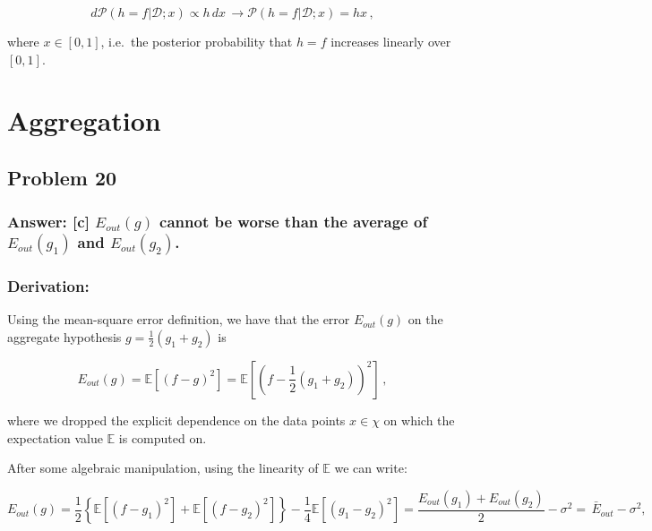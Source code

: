 \documentclass[11pt]{article}
\begin{document}
\begin{equation}
d\mathcal{P}(h=f|\mathcal{D};x)\propto h \,dx \,\rightarrow \mathcal{P}(h=f|\mathcal{D};x)=hx \,,
\end{equation}

where \(x\in[0,1]\), i.e.~the posterior probability that \(h=f\)
increases linearly over \([0,1]\).

    \hypertarget{aggregation}{%
\section{Aggregation}\label{aggregation}}

\hypertarget{problem-20}{%
\subsection{Problem 20}\label{problem-20}}

\hypertarget{answer-c-e_outg-cannot-be-worse-than-the-average-of-e_outg_1-and-e_outg_2.}{%
\subsubsection{\texorpdfstring{Answer: {[}c{]} \(E_{out}(g)\) cannot be
worse than the average of \(E_{out}(g_1)\) and
\(E_{out}(g_2)\).}{Answer: {[}c{]} E\_\{out\}(g) cannot be worse than the average of E\_\{out\}(g\_1) and E\_\{out\}(g\_2).}}\label{answer-c-e_outg-cannot-be-worse-than-the-average-of-e_outg_1-and-e_outg_2.}}

\hypertarget{derivation}{%
\subsubsection{Derivation:}\label{derivation}}

Using the mean-square error definition, we have that the error
\(E_{out}(g)\) on the aggregate hypothesis \(g=\frac{1}{2} (g_1+g_2)\)
is

\begin{equation}
E_{out}(g)=\mathbb{E}\left[\left(f-g\right)^2\right]=\mathbb{E}\left[\left(f-\frac{1}{2}(g_1+g_2)\right)^2\right]\,,
\end{equation}

where we dropped the explicit dependence on the data points \(x\in\chi\)
on which the expectation value \(\mathbb{E}\) is computed on.

After some algebraic manipulation, using the linearity of \(\mathbb{E}\)
we can write:

\begin{equation}
E_{out}(g)=\frac{1}{2}\left\{\mathbb{E}\left[\left(f-g_1\right)^2\right]+\mathbb{E}\left[\left(f-g_2\right)^2\right]\right\}-\frac{1}{4}\mathbb{E}\left[\left(g_1-g_2\right)^2\right]=\frac{E_{out}(g_1)+E_{out}(g_2)}{2}-\sigma^2=\,\bar{E}_{out}-\sigma^2,
\end{equation}
\end{document}
